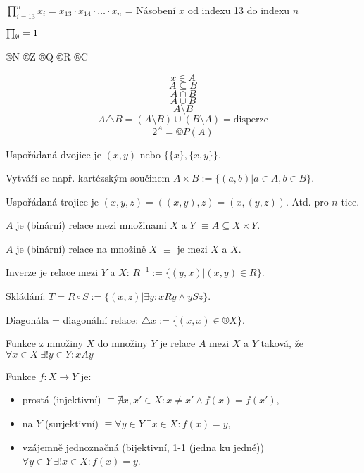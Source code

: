 \documentclass[12pt]{article}					%
\begin{document}
    \begin{definice}
        $\prod_{i=13}^n x_i = x_{13} \cdot x_{14} \cdot … \cdot x_n$ = Násobení $x$ od indexu 13 do indexu $n$

        $\prod_\emptyset = 1$
    \end{definice}

    \begin{poznamka}
        ®N ®Z ®Q ®R ®C
    \end{poznamka}

    \begin{poznamka}
        $$ x \in A $$
        $$ A \subseteq B $$
        $$ A \cap B $$
        $$ A \cup B $$ 
        $$ A \setminus B $$
        $$ A\triangle B = (A\setminus B)\cup(B\setminus A) = \text{disperze} $$
        $$ 2^A = ©P(A) $$
    \end{poznamka}

    \begin{definice}
        Uspořádaná dvojice je $(x, y)$ nebo $\{\{x\},\{x, y\}\}$.

        Vytváří se např. kartézským součinem $A\times B := \{(a,b)|a\in A, b \in B\}$.

        Uspořádaná trojice je $(x, y, z) = ((x, y), z) = (x, (y, z))$. Atd. pro $n$-tice.
    \end{definice}

    \begin{definice}[Relace]
        $A$ je (binární) relace mezi množinami $X$ a $Y$ $≡ A \subseteq X \times Y.$

        $A$ je (binární) relace na množině $X$ $≡$ je mezi $X$ a $X$.

        Inverze je relace mezi $Y$ a $X$: $R^{-1} := \{(y, x) | (x, y) \in R\}$.

        Skládání: $T = R \circ S := \{(x, z)| \exists y: xRy \land ySz\}$.

        Diagonála = diagonální relace: $\triangle x := \{(x, x) \in ®X\}$.
    \end{definice}

    \begin{definice}[Funkce = zobrazení]
        Funkce z množiny $X$ do množiny $Y$ je relace $A$ mezi $X$ a $Y$ taková, že $\forall x \in X\ \exists! y\in Y: xAy$    
    \end{definice}

    \begin{definice}
        Funkce $f: X \rightarrow Y$ je:
        \begin{itemize}
            \item prostá (injektivní) $≡ \nexists x, x' \in X: x≠x' \land f(x) = f(x')$,
            \item na $Y$ (surjektivní) $≡ \forall y \in Y\ \exists x \in X: f(x) = y$,
            \item vzájemně jednoznačná (bijektivní, 1-1 (jedna ku jedné)) $\forall y \in Y\ \exists! x \in X: f(x) = y$.
        \end{itemize}
    \end{definice}
\end{document}
